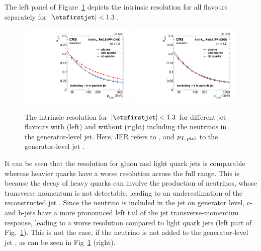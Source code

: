 The left panel of Figure~\ref{res:fig:ResolutionDifferences} depicts the intrinsic resolution for all flavours separately for $|\etafirstjet|<1.3$.
\begin{figure}[!t]
  \centering
      \includegraphics[width=0.49\textwidth]{figures/resolution/systematicUncertainties/Figure_38_withNu_Teresa_updated_4.pdf}
      \includegraphics[width=0.49\textwidth]{figures/resolution/systematicUncertainties/Figure_38_noNu_Teresa_updated_4.pdf}
  \caption{The intrinsic resolution \jerintr for $|\etafirstjet| < 1.3$ for different jet flavours with (left) and without (right) including the neutrinos in the generator-level jet.
           Here, JER refers to \jerintr, and $p_{\text{T,\,ptcl}}$ to the generator-level jet \pt. }  
  \label{res:fig:ResolutionDifferences}
\end{figure}
It can be seen that the resolution for gluon and light quark jets is comparable whereas heavier quarks have a worse resolution across the full \pt range.
This is because the decay of heavy quarks can involve the production of neutrinos, whose transverse momentum is not detectable, leading to an underestimation of the reconstructed jet \pt.
Since the neutrino \pt is included in the jet \pt on generator level, c- and b-jets have a more pronounced left tail of the jet transverse-momentum response, leading to a worse resolution compared to light quark jets (left part of Fig.~\ref{res:fig:ResolutionDifferences}). 
This is not the case, if the neutrino \pt is not added to the generator-level jet \pt, as can be seen in Fig~\ref{res:fig:ResolutionDifferences} (right).

